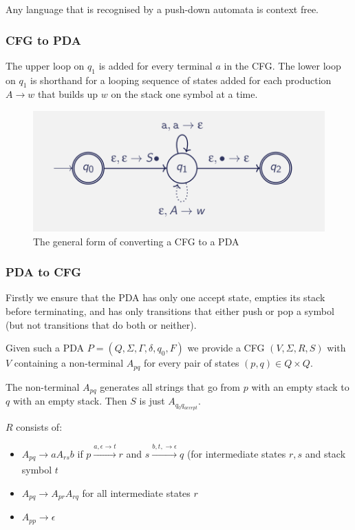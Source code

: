 \documentclass{article}
\begin{document}
Any language that is recognised by a push-down automata is context free.

\subsubsection{CFG to PDA}
The upper loop on $q_1$ is added for every terminal $a$ in the CFG. The lower loop on $q_1$ is shorthand for a looping sequence of states added for each production $A \to w$ that builds up $w$ on the stack one symbol at a time.

\begin{figure}[H]
    \centering
    \includegraphics[width=0.75\linewidth]{images/cfg-to-pda.png}
    \caption{The general form of converting a CFG to a PDA}
\end{figure}


\subsubsection{PDA to CFG}
Firstly we ensure that the PDA has only one accept state, empties its stack before terminating, and has only transitions that either push or pop a symbol (but not transitions that do both or neither).

Given such a PDA $P=(Q, \Sigma, \Gamma, \delta, q_0, F)$ we provide a CFG $(V, \Sigma, R, S)$ with $V$ containing a non-terminal $A_{pq}$ for every pair of states $(p,q) \in Q \times Q$.

The non-terminal $A_{pq}$ generates all strings that go from $p$ with an empty stack to $q$ with an empty stack. Then $S$ is just $A_{q_0q_{accept}}$.

$R$ consists of:
\begin{itemize}
    \item $A_{pq} \to aA_{rs}b$ if $p \xrightarrow[]{a,\epsilon \to t}r$ and $s \xrightarrow[]{b, t, \to \epsilon}q$ (for intermediate states $r, s$ and stack symbol $t$
    \item $A_{pq} \to A_{pr}A_{rq}$ for all intermediate states $r$
    \item $A_{pp} \to \epsilon$
\end{itemize}
\end{document}
